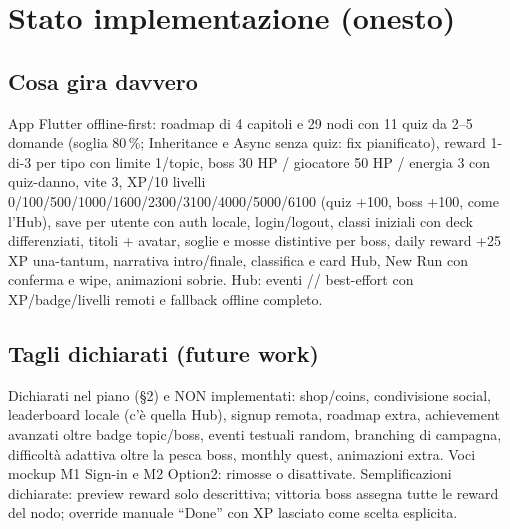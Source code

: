 \chapter{Stato implementazione (onesto)}
\label{g:stato}

\section{Cosa gira davvero}
App Flutter offline-first: roadmap di 4 capitoli e 29 nodi con 11 quiz
da 2--5 domande (soglia 80\,\%; Inheritance e Async senza quiz: fix
pianificato), reward 1-di-3 per tipo
con limite 1/topic, boss 30 HP / giocatore 50 HP / energia 3 con
quiz-danno, vite 3, XP/10 livelli 0/100/500/1000/1600/2300/3100/4000/5000/6100 (quiz +100, boss +100, come
l'Hub), save per utente con auth locale, login/logout, classi iniziali
con deck differenziati, titoli + avatar, soglie e mosse distintive per boss, daily
reward +25 XP una-tantum, narrativa intro/finale, classifica e card Hub,
New Run con conferma e wipe, animazioni sobrie. Hub: eventi
//
best-effort con XP/badge/livelli remoti e fallback offline completo.

\section{Tagli dichiarati (future work)}
Dichiarati nel piano (\S2) e NON implementati: shop/coins, condivisione
social, leaderboard locale (c'\`e quella Hub), signup remota,
roadmap extra, achievement avanzati oltre badge topic/boss, eventi
testuali random, branching di campagna, difficolt\`a adattiva oltre la
pesca boss, monthly quest, animazioni extra. Voci mockup M1 Sign-in e M2
Option2: rimosse o disattivate. Semplificazioni dichiarate: preview
reward solo descrittiva; vittoria boss assegna tutte le reward del nodo;
override manuale ``Done'' con XP lasciato come scelta esplicita.

\medskip
\noindent{}

